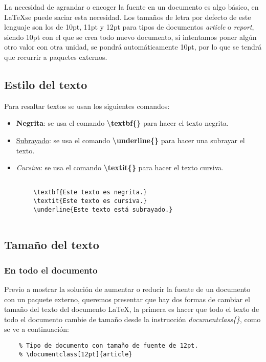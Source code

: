 La necesidad de agrandar o encoger la fuente en un documento es algo básico, en \LaTeX se puede saciar esta necesidad. Los tamaños de letra por defecto de este lenguaje son los de 10pt, 11pt y 12pt para tipos de documentos \textit{article} o \textit{report}, siendo 10pt con el que se crea todo nuevo documento, si intentamos poner algún otro valor con otra unidad, se pondrá automáticamente 10pt, por lo que se tendrá que recurrir a paquetes externos.


\subsection{Estilo del texto}

Para resaltar textos se usan los siguientes comandos:
\begin{itemize}
    \item \textbf{Negrita}: se usa el comando \textbf{\textbackslash{textbf\{\}}} para hacer el texto negrita.
    \item \underline{Subrayado}: se usa el comando \textbf{\textbackslash{underline\{\}}} para hacer una subrayar el texto.
    \item \textit{Cursiva}: se usa el comando \textbf{\textbackslash{textit\{\}}} para hacer el texto cursiva.
\end{itemize}
\begin{lstlisting}
    
        \textbf{Este texto es negrita.}
        \textit{Este texto es cursiva.}
        \underline{Este texto está subrayado.}
    
\end{lstlisting}


\subsection{Tamaño del texto}


\subsubsection{En todo el documento}

Previo a mostrar la solución de aumentar o reducir la fuente de un documento con un paquete externo, queremos presentar que hay dos formas de cambiar el tamaño del texto del documento \LaTeX, la primera es hacer que todo el texto de todo el documento cambie de tamaño desde la instrucción \textit{documentclass\{\}}, como se ve a continuación:
\begin{lstlisting}
    % Tipo de documento con tamaño de fuente de 12pt.
    % \documentclass[12pt]{article}
\end{lstlisting}

